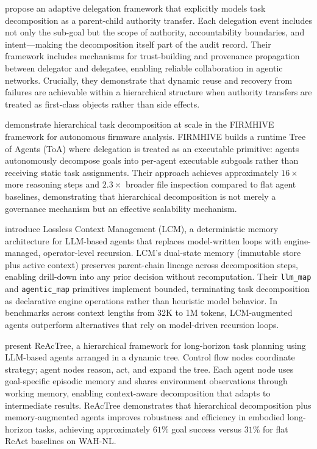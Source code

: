 propose an adaptive delegation framework that explicitly models task decomposition as a parent-child authority transfer. Each delegation event includes not only the sub-goal but the scope of authority, accountability boundaries, and intent---making the decomposition itself part of the audit record. Their framework includes mechanisms for trust-building and provenance propagation between delegator and delegatee, enabling reliable collaboration in agentic networks. Crucially, they demonstrate that dynamic reuse and recovery from failures are achievable within a hierarchical structure when authority transfers are treated as first-class objects rather than side effects.

 demonstrate hierarchical task decomposition at scale in the FIRMHIVE framework for autonomous firmware analysis. FIRMHIVE builds a runtime Tree of Agents (ToA) where delegation is treated as an executable primitive: agents autonomously decompose goals into per-agent executable subgoals rather than receiving static task assignments. Their approach achieves approximately $16\times$ more reasoning steps and $2.3\times$ broader file inspection compared to flat agent baselines, demonstrating that hierarchical decomposition is not merely a governance mechanism but an effective scalability mechanism.

 introduce Lossless Context Management (LCM), a deterministic memory architecture for LLM-based agents that replaces model-written loops with engine-managed, operator-level recursion. LCM's dual-state memory (immutable store plus active context) preserves parent-chain lineage across decomposition steps, enabling drill-down into any prior decision without recomputation. Their \texttt{llm\_map} and \texttt{agentic\_map} primitives implement bounded, terminating task decomposition as declarative engine operations rather than heuristic model behavior. In benchmarks across context lengths from 32K to 1M tokens, LCM-augmented agents outperform alternatives that rely on model-driven recursion loops.

 present ReAcTree, a hierarchical framework for long-horizon task planning using LLM-based agents arranged in a dynamic tree. Control flow nodes coordinate strategy; agent nodes reason, act, and expand the tree. Each agent node uses goal-specific episodic memory and shares environment observations through working memory, enabling context-aware decomposition that adapts to intermediate results. ReAcTree demonstrates that hierarchical decomposition plus memory-augmented agents improves robustness and efficiency in embodied long-horizon tasks, achieving approximately $61\%$ goal success versus $31\%$ for flat ReAct baselines on WAH-NL.

